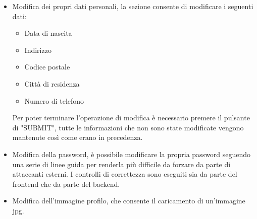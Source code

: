 \begin{itemize}
    \item Modifica dei propri dati personali, la sezione consente di modificare i seguenti dati:
    \begin{itemize}
        \item Data di nascita
        \item Indirizzo
        \item Codice postale
        \item Città di residenza
        \item Numero di telefono
    \end{itemize}
    Per poter terminare l'operazione di modifica è necessario premere il pulsante di "SUBMIT", tutte le informazioni che non sono state modificate vengono mantenute così come erano in precedenza.
    
    \item Modifica della password, è possibile modificare la propria password seguendo una serie di linee guida per renderla più difficile da forzare da parte di attaccanti esterni. I controlli di correttezza sono eseguiti sia da parte del frontend che da parte del backend.
    
    \item Modifica dell'immagine profilo, che consente il caricamento di un'immagine jpg.
    

\end{itemize}
